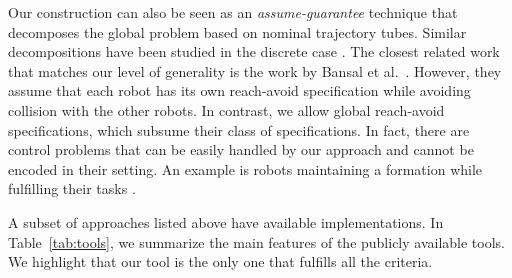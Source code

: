 \begin{enumerate}[(1)]
Our construction can also be seen as an \emph{assume-guarantee} technique that decomposes the global problem based on nominal trajectory tubes. Similar decompositions have been studied in the discrete case \cite{alur2015pattern,majumdarassume}.
The closest related work that matches our level of generality is the work by Bansal et al.\ \cite{bansal2017safe}.
However, they assume that each robot has its own reach-avoid specification while avoiding collision with the other robots.
In contrast, we allow global reach-avoid specifications, which subsume their class of specifications.
In fact, there are control problems that can be easily handled by our approach and cannot be encoded in their setting. An example is robots maintaining a formation while fulfilling their tasks \cite{alonso2019distributed}.
\end{enumerate}

A subset of approaches listed above have available implementations.
In Table~\ref{tab:tools}, we summarize the main features of the publicly available tools.
We highlight that our tool \tool is the only one that fulfills all the criteria.

